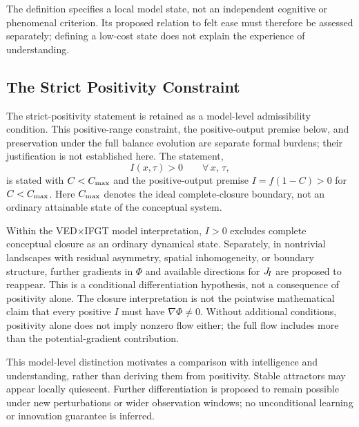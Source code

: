 The definition specifies a local model state, not an independent cognitive
or phenomenal criterion. Its proposed relation to felt ease must therefore
be assessed separately; defining a low-cost state does not explain the
experience of understanding.

\subsection{The Strict Positivity Constraint}

The strict-positivity statement is retained as a model-level admissibility
condition. This positive-range constraint, the positive-output premise
below, and preservation under the full balance evolution are separate
formal burdens; their justification is not established here. The statement,
\begin{equation}
  \boxed{I(x,\tau) > 0 \qquad \forall\,x,\,\tau,}
  \label{eq:positivity}
\end{equation}
is stated with $C < C_{\max}$ and the positive-output premise $I = f(1-C) > 0$ for
$C < C_{\max}$.
Here $C_{\max}$ denotes the ideal complete-closure boundary, not an
ordinary attainable state of the conceptual system.

\begin{proposition}
Within the VED$\times$IFGT model interpretation, $I>0$ excludes complete
conceptual closure as an ordinary dynamical state.
Separately, in nontrivial landscapes with residual asymmetry,
spatial inhomogeneity, or boundary structure, further gradients in $\Phi$
and available directions for $J_{\!I}$ are proposed to reappear.
This is a conditional differentiation hypothesis, not a consequence of
positivity alone. The closure interpretation is not the pointwise
mathematical claim that every positive $I$ must have
$\nabla\Phi\neq0$.
Without additional conditions, positivity alone does not imply nonzero
flow either; the full flow includes more than the potential-gradient
contribution.
\end{proposition}

\begin{remark}
This model-level distinction motivates a comparison with intelligence
and understanding, rather than deriving them from positivity.
Stable attractors may appear locally quiescent. Further differentiation
is proposed to remain possible under new perturbations or wider observation
windows; no unconditional learning or innovation guarantee is inferred.
\end{remark}
